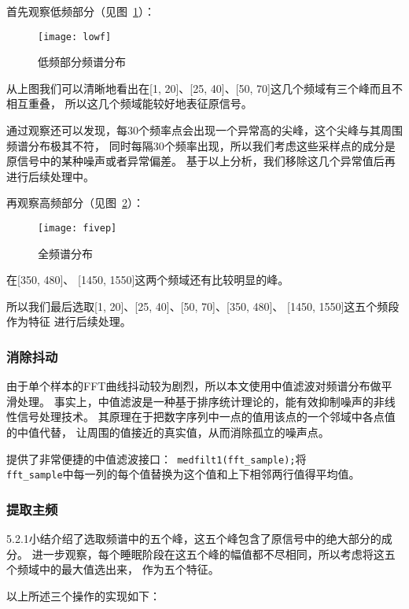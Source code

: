 首先观察低频部分（见图~\ref{fig:lowf}）：

\begin{figure}[ht]
	\centering
	\texttt{[image: lowf]}
	\caption{低频部分频谱分布}
	\label{fig:lowf}
\end{figure}

从上图我们可以清晰地看出在[1, 20]、[25, 40]、[50, 70]这几个频域有三个峰而且不相互重叠，
所以这几个频域能较好地表征原信号。

通过观察还可以发现，每30个频率点会出现一个异常高的尖峰，这个尖峰与其周围频谱分布极其不符，
同时每隔30个频率出现，所以我们考虑这些采样点的成分是原信号中的某种噪声或者异常偏差。
基于以上分析，我们移除这几个异常值后再进行后续处理中。

再观察高频部分（见图~\ref{fig:fivep}）：

\begin{figure}[ht]
	\centering
	\texttt{[image: fivep]}
	\caption{全频谱分布}
	\label{fig:fivep}
\end{figure}

在[350, 480]、 [1450, 1550]这两个频域还有比较明显的峰。

所以我们最后选取[1, 20]、[25, 40]、[50, 70]、[350, 480]、 [1450, 1550]这五个频段作为特征
进行后续处理。

\subsubsection{消除抖动}

由于单个样本的FFT曲线抖动较为剧烈，所以本文使用中值滤波对频谱分布做平滑处理。
事实上，中值滤波是一种基于排序统计理论的，能有效抑制噪声的非线性信号处理技术。
其原理在于把数字序列中一点的值用该点的一个邻域中各点值的中值代替，
让周围的值接近的真实值，从而消除孤立的噪声点。

\MATLAB 提供了非常便捷的中值滤波接口：\lstinline| medfilt1(fft_sample);|将\\
\lstinline|fft_sample|中每一列的每个值替换为这个值和上下相邻两行值得平均值。

\subsubsection{提取主频}

5.2.1小结介绍了选取频谱中的五个峰，这五个峰包含了原信号中的绝大部分的成分。
进一步观察，每个睡眠阶段在这五个峰的幅值都不尽相同，所以考虑将这五个频域中的最大值选出来，
作为五个特征。

以上所述三个操作的实现如下：

